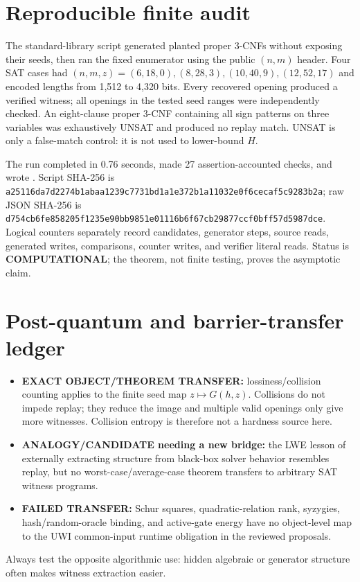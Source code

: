 \documentclass[11pt]{article}
\newcommand{\Hmin}{H}
\begin{document}
\section{Reproducible finite audit}
The standard-library script
generated planted proper 3-CNFs without exposing their seeds, then ran the fixed
enumerator using the public $(n,m)$ header.  Four SAT cases had
$(n,m,z)=(6,18,0),(8,28,3),(10,40,9),(12,52,17)$ and encoded lengths from
1,512 to 4,320 bits.  Every recovered opening produced a verified witness; all
openings in the tested seed ranges were independently checked.  An eight-clause
proper 3-CNF containing all sign patterns on three variables was exhaustively UNSAT
and produced no replay match.  UNSAT is only a false-match control: it is not used
to lower-bound $\Hmin$.

The run completed in 0.76 seconds, made 27 assertion-accounted checks, and wrote
.
Script SHA-256 is
\texttt{a25116da7d2274b1abaa1239c7731bd1a1e372b1a11032e0f6cecaf5c9283b2a};
raw JSON SHA-256 is
\texttt{d754cb6fe858205f1235e90bb9851e01116b6f67cb29877ccf0bff57d5987dce}.
Logical counters separately record candidates, generator steps, source reads,
generated writes, comparisons, counter writes, and verifier literal reads.
Status is \textbf{COMPUTATIONAL}; the theorem, not finite testing, proves the
asymptotic claim.

\section{Post-quantum and barrier-transfer ledger}
\begin{itemize}
\item \textbf{EXACT OBJECT/THEOREM TRANSFER:} lossiness/collision counting applies
to the finite seed map $z\mapsto G(h,z)$.  Collisions do not impede replay; they
reduce the image and multiple valid openings only give more witnesses.  Collision
entropy is therefore not a hardness source here.
\item \textbf{ANALOGY/CANDIDATE needing a new bridge:} the LWE lesson of externally
extracting structure from black-box solver behavior resembles replay, but no
worst-case/average-case theorem transfers to arbitrary SAT witness programs.
\item \textbf{FAILED TRANSFER:} Schur squares, quadratic-relation rank, syzygies,
hash/random-oracle binding, and active-gate energy have no object-level map to the
UWI common-input runtime obligation in the reviewed proposals.
\end{itemize}
Always test the opposite algorithmic use: hidden algebraic or generator structure
often makes witness extraction easier.
\end{document}
